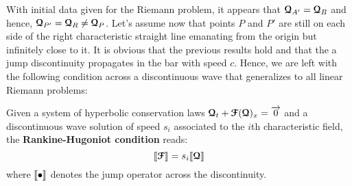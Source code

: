 With initial data given for the Riemann problem, it appears that ${\boldsymbol{\mathcal{Q}}}_{A'}={\boldsymbol{\mathcal{Q}}}_{B}$ and hence, ${\boldsymbol{\mathcal{Q}}}_{P'}={\boldsymbol{\mathcal{Q}}}_{R} \ne {\boldsymbol{\mathcal{Q}}}_{P}$. Let's assume now that points $P$ and $P'$ are still on each side of the right characteristic straight line emanating from the origin but infinitely close to it. It is obvious that the previous results hold and that the a jump discontinuity propagates in the bar with speed $c$. Hence, we are left with the following condition across a discontinuous wave \cite{Toro} that generalizes to all linear Riemann problems:
\begin{definition}
Given a system of hyperbolic conservation laws ${\boldsymbol{\mathcal{Q}}}_t + {\boldsymbol{\mathcal{F}}}({\boldsymbol{\mathcal{Q}}})_x={\overrightarrow{0}}$ and a discontinuous wave solution of speed $s_i$ associated to the $i$th characteristic field, the \textbf{Rankine-Hugoniot condition} reads:
\begin{equation}
  \label{eq:rankine-hugoniot}
  \llbracket  {\boldsymbol{\mathcal{F}}} \rrbracket = s_i \llbracket  {\boldsymbol{\mathcal{Q}}} \rrbracket
\end{equation}
where $\llbracket \bullet \rrbracket$ denotes the jump operator across the discontinuity.  
\end{definition}

